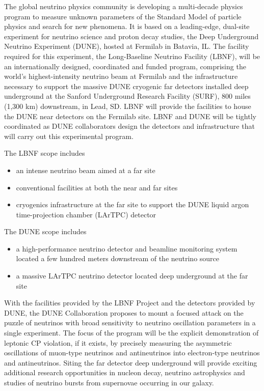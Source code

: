 

The global neutrino physics community is developing a multi-decade physics program to measure unknown parameters of the Standard Model of particle physics and search for new phenomena.   It is based on a leading-edge, dual-site experiment
for neutrino science and proton decay studies, the Deep Underground Neutrino Experiment 
(DUNE), hosted at Fermilab in Batavia, IL. The facility required for this experiment, the Long-Baseline 
Neutrino Facility (LBNF), will be an internationally designed, coordinated and funded program, comprising 
the world's highest-intensity neutrino beam at Fermilab and the infrastructure necessary to support 
the massive DUNE cryogenic far detectors installed deep underground at the Sanford Underground 
Research Facility (SURF), 800 miles (1,300 km) downstream, in Lead, SD. LBNF will provide the 
facilities to house the DUNE near detectors on the Fermilab site. LBNF and DUNE will be tightly coordinated as DUNE collaborators design the detectors and infrastructure that will carry out this experimental program. 
  
The LBNF scope includes 
\begin{itemize}
\item an intense neutrino beam aimed at a far site
\item conventional facilities at both the near and far sites
\item cryogenics infrastructure at the far site to support the DUNE liquid argon time-projection
chamber (LArTPC) detector
\end{itemize}

The DUNE scope includes
\begin{itemize}
\item %
a high-performance neutrino detector and beamline monitoring system located a few hundred meters downstream of the neutrino source
\item a massive LArTPC neutrino detector located deep underground at the far site
\end{itemize}

With the facilities provided by the LBNF Project and the detectors provided by DUNE, the DUNE Collaboration proposes to mount a focused attack on the puzzle of neutrinos with broad sensitivity 
to neutrino oscillation parameters in a single experiment.  The focus of the program will be the explicit 
demonstration of leptonic CP violation, if it exists, by precisely measuring the asymmetric oscillations of 
muon-type neutrinos and antineutrinos into electron-type neutrinos and antineutrinos.
Siting the far detector deep underground will provide
exciting additional research opportunities in nucleon decay, neutrino
astrophysics and studies of neutrino bursts from supernovae occurring in our galaxy.

